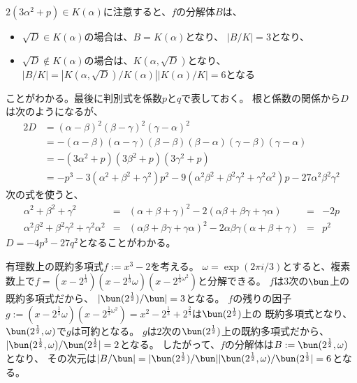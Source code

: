 {	$2(3\alpha^2 + p)\in K(\alpha)$に注意すると、$f$の分解体$B$は、
	\begin{itemize}\setlength{\itemsep}{-1mm} %
		\item $\sqrt{D}\in K(\alpha)$の場合は、$B=K(\alpha)$となり、
		$|B/K|=3$となり、
		\item $\sqrt{D}\not\in K(\alpha)$の場合は、$K(\alpha,\sqrt{D})$となり、
		$|B/K|=|K(\alpha,\sqrt{D})/K(\alpha)||K(\alpha)/K|=6$となる
	\end{itemize} %
	ことがわかる。最後に判別式を係数$p$と$q$で表しておく。
	根と係数の関係から$D$は次のようになるが、
	\begin{alignat*}{2}
		D &= (\alpha-\beta)^2(\beta-\gamma)^2(\gamma - \alpha)^2 \\
		&= - (\alpha-\beta)(\alpha-\gamma)(\beta-\beta)(\beta-\alpha)
			(\gamma-\beta)(\gamma-\alpha) \\
		&= -(3\alpha^2 + p)(3\beta^2 + p)(3\gamma^2 + p) \\
		&= - p^3 - 3(\alpha^2 + \beta^2 + \gamma^2)p^2
		- 9(\alpha^2\beta^2 + \beta^2\gamma^2 + \gamma^2\alpha^2)p
		- 27\alpha^2\beta^2\gamma^2
	\end{alignat*}
	次の式を使うと、
	\begin{equation*}\begin{array}{rclcl}
		\alpha^2 + \beta^2 + \gamma^2 &=& (\alpha + \beta + \gamma)^2
			- 2(\alpha\beta + \beta\gamma + \gamma\alpha) &=& -2p \\
		\alpha^2\beta^2 + \beta^2\gamma^2 + \gamma^2\alpha^2 
		&=& (\alpha\beta + \beta\gamma + \gamma\alpha)^2
			- 2\alpha\beta\gamma(\alpha + \beta + \gamma) &=& p^2
	\end{array}\end{equation*}
	$D=-4p^3-27q^2$となることがわかる。

	\begin{example}[分解体その一]\label{eg:分解体その一} %
		有理数上の既約多項式$f:=x^3-2$を考える。
		$\omega=\exp(2\pi i/3)$とすると、複素数上で$f=(x-2^{\frac{1}{3}})
		(x-2^{\frac{1}{3}}\omega)(x-2^{\frac{1}{3}\omega^2})$と分解できる。
		$f$は$3$次の$\bun$上の既約多項式だから、
		$|\bun(2^{\frac{1}{2}})/\bun|=3$となる。
		$f$の残りの因子$g:=(x-2^{\frac{1}{3}}\omega)(x-2^{\frac{1}{3}\omega^2})
		=x^2-2^{\frac{1}{3}}+2^{\frac{2}{3}}$は$\bun(2^{\frac{1}{2}})$上の
		既約多項式となり、$\bun(2^{\frac{1}{2}},\omega)$で$g$は可約となる。
		$g$は$2$次の$\bun(2^{\frac{1}{2}})$上の既約多項式だから、
		$|\bun(2^{\frac{1}{2}},\omega)/\bun(2^{\frac{1}{2}}|=2$となる。
		したがって、$f$の分解体は$B:=\bun(2^{\frac{1}{2}},\omega)$となり、
		その次元は$|B/\bun|=|\bun(2^{\frac{1}{2}})/\bun|
		|\bun(2^{\frac{1}{2}},\omega)/\bun(2^{\frac{1}{2}}|=6$となる。
	\end{example} %
}
